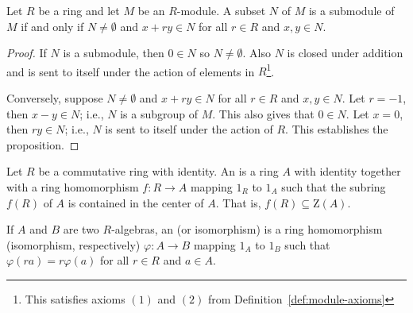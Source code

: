     \begin{proposition}\label{prop:submodule-criterion}
        Let $R$ be a ring and let $M$ be an $R$-module. A subset $N$ of $M$ is a submodule of $M$ if and only if $N \neq \emptyset$ and $x+ry \in N$ for all $r \in R$ and $x,y \in N$.
        \begin{proof}
            If $N$ is a submodule, then $0 \in N$  so $N \neq \emptyset$. Also $N$ is closed under addition and is sent to itself under the action of elements in $R$\footnote{This satisfies axioms $(1)$ and $(2)$ from Definition~\ref{def:module-axioms}}.  

            Conversely, suppose $N \neq \emptyset$ and $x+ry \in N$ for all $r \in R$ and $x,y \in N$. Let $r = -1$, then $x-y \in N$; i.e., $N$ is a subgroup of $M$. This also gives that $0 \in N$. Let $x = 0$, then $ry \in N$; i.e., $N$ is sent to itself under the action of $R$. This establishes the proposition.
        \end{proof}
    \end{proposition}

    \begin{definition}\label{def:r-algebra}
        Let $R$ be a commutative ring with identity. An  is a ring $A$ with identity together with a ring homomorphism $f: R \rightarrow A$ mapping $1_R$ to $1_A$ such that the subring $f(R)$ of $A$ is contained in the center of $A$. That is, $f(R) \subseteq \text{Z}(A)$.
    \end{definition}

    \begin{definition}\label{def:r-algeba-homomorphism}
        If $A$ and $B$ are two $R$-algebras, an  (or isomorphism) is a ring homomorphism (isomorphism, respectively) $\varphi:A \rightarrow B$ mapping $1_A$ to $1_B$ such that $\varphi(ra) = r\varphi(a)$ for all $r \in R$ and $a \in A$.
    \end{definition}

